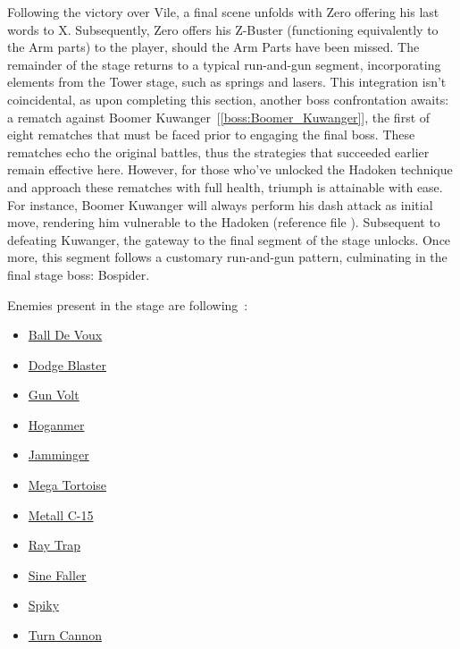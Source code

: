 Following the victory over Vile, a final scene unfolds with Zero offering his last words to X. Subsequently, Zero offers his Z-Buster (functioning equivalently to the Arm parts) to the player, should the Arm Parts have been missed. The remainder of the stage returns to a typical run-and-gun segment, incorporating elements from the Tower stage, such as springs and lasers. This integration isn't coincidental, as upon completing this section, another boss confrontation awaits: a rematch against Boomer Kuwanger~[\ref{boss:Boomer_Kuwanger}], the first of eight rematches that must be faced prior to engaging the final boss. These rematches echo the original battles, thus the strategies that succeeded earlier remain effective here. However, for those who've unlocked the Hadoken technique and approach these rematches with full health, triumph is attainable with ease. For instance, Boomer Kuwanger will always  perform his dash attack as initial move, rendering him vulnerable to the Hadoken (reference file ). Subsequent to defeating Kuwanger, the gateway to the final segment of the stage unlocks. Once more, this segment follows a customary run-and-gun pattern, culminating in the final stage boss: Bospider.

Enemies present in the stage are following~\cite{wiki:sigma_stages}:
\begin{itemize}
	\item \hyperlink {enem:Ball_De_Voux}{Ball De Voux}
	\item \hyperlink {enem:Dodge_Blaster}{Dodge Blaster}
	\item \hyperlink {enem:Gun_Volt}{Gun Volt}
	\item \hyperlink {enem:Hoganmer}{Hoganmer}
	\item \hyperlink {enem:Jamminger}{Jamminger}
	\item \hyperlink {enem:Mega_Tortoise}{Mega Tortoise}
	\item \hyperlink {enem:Metall_C-15}{Metall C-15}
	\item \hyperlink {enem:Ray_Trap}{Ray Trap}
	\item \hyperlink {enem:Sine_Faller}{Sine Faller}
	\item \hyperlink {enem:Spiky}{Spiky}
	\item \hyperlink {enem:Turn_Cannon}{Turn Cannon}
\end{itemize}

